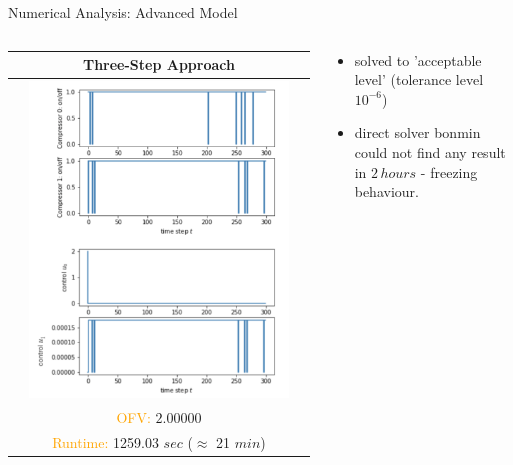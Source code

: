 \documentclass[8pt]{beamer}
\begin{document}
\begin{frame}{Numerical Analysis: Advanced Model}
\begin{columns}[T]
\begin{column}{.48\textwidth}
\begin{tabular}{c} \hline
Three-Step Approach \\\hline
\includegraphics[width=0.9\textwidth]{images/AdvancedModel3Step} \\
\textcolor{orange}{OFV:} $2.00000$  \\ 
\textcolor{orange}{Runtime:} 1259.03 $sec$ ($\approx$ 21 $min$)
\end{tabular}
\end{column}
\begin{column}{.48\textwidth}
\begin{center}
\begin{itemize}
\item solved to 'acceptable level' (tolerance level $10^{-6}$)
\item direct solver bonmin could not find any result in $2 \, hours$ - freezing behaviour.  
\end{itemize}
\end{center}
\end{column}
\end{columns}
\end{frame}
\end{document}
